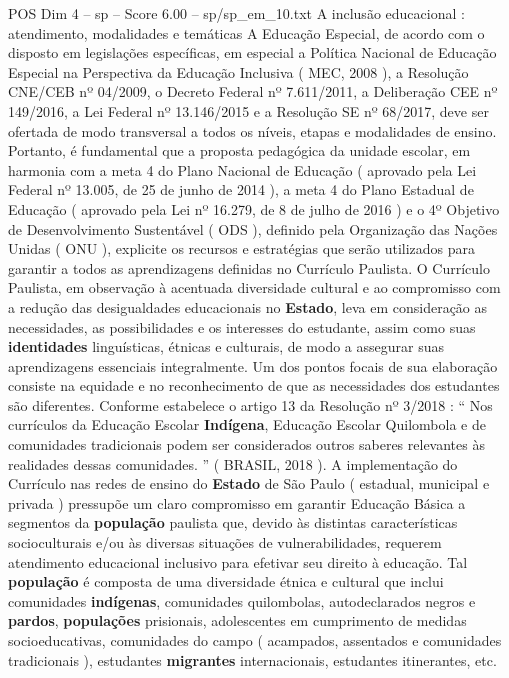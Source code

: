 \begin{textsample}{POS Dim 4 – sp – Score 6.00 – sp/sp\_em\_10.txt}  \label{ex:f4_pos_255}
A inclusão educacional : atendimento, modalidades e temáticas A Educação Especial, de acordo com o disposto em legislações específicas, em especial a Política Nacional de Educação Especial na Perspectiva da Educação Inclusiva ( MEC, 2008 ), a Resolução CNE/CEB nº 04/2009, o Decreto Federal nº 7.611/2011, a Deliberação CEE nº 149/2016, a Lei Federal nº 13.146/2015 e a Resolução SE nº 68/2017, deve ser ofertada de modo transversal a todos os níveis, etapas e modalidades de ensino.
Portanto, é fundamental que a proposta pedagógica da unidade escolar, em harmonia com a meta 4 do Plano Nacional de Educação ( aprovado pela Lei Federal nº 13.005, de 25 de junho de 2014 ), a meta 4 do Plano Estadual de Educação ( aprovado pela Lei nº 16.279, de 8 de julho de 2016 ) e o 4º Objetivo de Desenvolvimento Sustentável ( ODS ), definido pela Organização das Nações Unidas ( ONU ), explicite os recursos e estratégias que serão utilizados para garantir a todos as aprendizagens definidas no Currículo Paulista.
O Currículo Paulista, em observação à acentuada diversidade cultural e ao compromisso com a redução das desigualdades educacionais no \textbf{Estado}, leva em consideração as necessidades, as possibilidades e os interesses do estudante, assim como suas \textbf{identidades} linguísticas, étnicas e culturais, de modo a assegurar suas aprendizagens essenciais integralmente.
Um dos pontos focais de sua elaboração consiste na equidade e no reconhecimento de que as necessidades dos estudantes são diferentes.
Conforme estabelece o artigo 13 da Resolução nº 3/2018 : “ Nos currículos da Educação Escolar \textbf{Indígena}, Educação Escolar Quilombola e de comunidades tradicionais podem ser considerados outros saberes relevantes às realidades dessas comunidades. ” ( BRASIL, 2018 ).
A implementação do Currículo nas redes de ensino do \textbf{Estado} de São Paulo ( estadual, municipal e privada ) pressupõe um claro compromisso em garantir Educação Básica a segmentos da \textbf{população} paulista que, devido às distintas características socioculturais e/ou às diversas situações de vulnerabilidades, requerem atendimento educacional inclusivo para efetivar seu direito à educação.
Tal \textbf{população} é composta de uma diversidade étnica e cultural que inclui comunidades \textbf{indígenas}, comunidades quilombolas, autodeclarados negros e \textbf{pardos}, \textbf{populações} prisionais, adolescentes em cumprimento de medidas socioeducativas, comunidades do campo ( acampados, assentados e comunidades tradicionais ), estudantes \textbf{migrantes} internacionais, estudantes itinerantes, etc.

\end{textsample}
